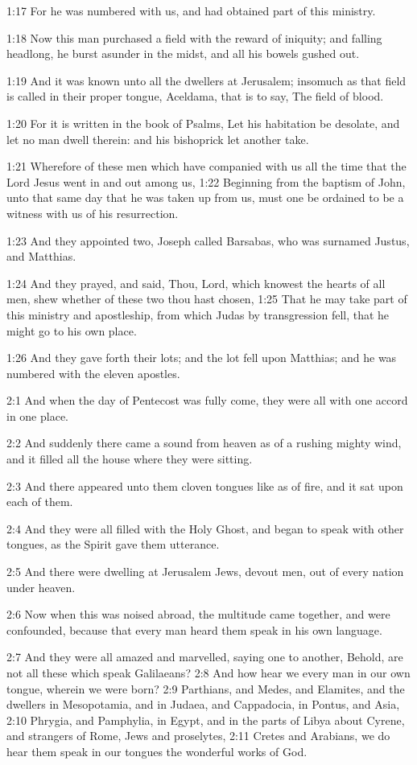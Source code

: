 1:17 For he was numbered with us, and had obtained part of this ministry.

1:18 Now this man purchased a field with the reward of iniquity; and falling headlong, he burst asunder in the midst, and all his bowels gushed out.

1:19 And it was known unto all the dwellers at Jerusalem; insomuch as that field is called in their proper tongue, Aceldama, that is to say, The field of blood.

1:20 For it is written in the book of Psalms, Let his habitation be desolate, and let no man dwell therein: and his bishoprick let another take.

1:21 Wherefore of these men which have companied with us all the time that the Lord Jesus went in and out among us, 1:22 Beginning from the baptism of John, unto that same day that he was taken up from us, must one be ordained to be a witness with us of his resurrection.

1:23 And they appointed two, Joseph called Barsabas, who was surnamed Justus, and Matthias.

1:24 And they prayed, and said, Thou, Lord, which knowest the hearts of all men, shew whether of these two thou hast chosen, 1:25 That he may take part of this ministry and apostleship, from which Judas by transgression fell, that he might go to his own place.

1:26 And they gave forth their lots; and the lot fell upon Matthias; and he was numbered with the eleven apostles.

2:1 And when the day of Pentecost was fully come, they were all with one accord in one place.

2:2 And suddenly there came a sound from heaven as of a rushing mighty wind, and it filled all the house where they were sitting.

2:3 And there appeared unto them cloven tongues like as of fire, and it sat upon each of them.

2:4 And they were all filled with the Holy Ghost, and began to speak with other tongues, as the Spirit gave them utterance.

2:5 And there were dwelling at Jerusalem Jews, devout men, out of every nation under heaven.

2:6 Now when this was noised abroad, the multitude came together, and were confounded, because that every man heard them speak in his own language.

2:7 And they were all amazed and marvelled, saying one to another, Behold, are not all these which speak Galilaeans?  2:8 And how hear we every man in our own tongue, wherein we were born?  2:9 Parthians, and Medes, and Elamites, and the dwellers in Mesopotamia, and in Judaea, and Cappadocia, in Pontus, and Asia, 2:10 Phrygia, and Pamphylia, in Egypt, and in the parts of Libya about Cyrene, and strangers of Rome, Jews and proselytes, 2:11 Cretes and Arabians, we do hear them speak in our tongues the wonderful works of God.

